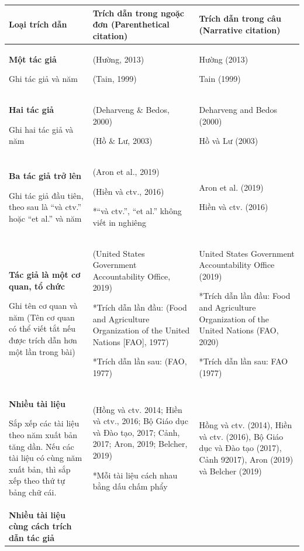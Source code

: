 \documentclass[a4paper,oneside]{../../styles/thesis}
\begin{document}
\begin{table}
\centering
\begin{tabular}{|l|l|l|}
    \hline
      Loại trích dẫn   & Trích dẫn trong ngoặc đơn (Parenthetical citation) & Trích dẫn trong câu 
(Narrative citation)
\\
     \hline
       \textbf{Một tác giả}
       
Ghi tác giả và năm
  & (Hường, 2013)
  
(Tain, 1999)
 & Hường (2013)
 
Tain (1999)
\\
    \hline
   \textbf{Hai tác giả}
   
Ghi hai tác giả và năm		
      & (Deharveng $\&$ Bedos, 2000) 
      
(Hồ $\&$ Lư, 2003) & Deharveng and Bedos (2000)

Hồ và Lư (2003)\\
         \hline
       \textbf{Ba tác giả trở lên}
       
Ghi tác giả đầu tiên, theo sau là ``và ctv.'' hoặc ``et al.'' và năm 
  & (Aron et al., 2019)
  
(Hiền và ctv., 2016)

*``và ctv.'', ``et al.'' không viết in nghiêng
 & Aron et al. (2019)
 
Hiền và ctv. (2016)
\\
\hline
  \textbf{Tác giả là một cơ quan, tổ chức}
  
Ghi tên cơ quan và năm (Tên cơ quan có thể viết tắt nếu được trích dẫn hơn một lần trong bài)
       &  (United States Government Accountability Office, 2019)

*Trích dẫn lần đầu:
 (Food and Agriculture Organization of the United Nations [FAO], 1977)
 
*Trích dẫn lần sau:
(FAO, 1977)
 & United States Government Accountability Office (2019)

*Trích dẫn lần đầu:
Food and Agriculture Organization of the United Nations (FAO, 2020)

*Trích dẫn lần sau:
FAO (1977)
 \\
      \hline
       \textbf{Nhiều tài liệu}
       
Sắp xếp các tài liệu theo năm xuất bản tăng dần. Nếu các tài liệu có cùng năm xuất bản, thì sắp xếp theo thứ tự bảng chữ cái.
  & (Hồng và ctv. 2014; Hiền và ctv., 2016; Bộ Giáo dục và Đào tạo, 2017; Cảnh, 2017; Aron, 2019; Belcher, 2019)
  
  *Mỗi tài liệu cách nhau bằng dấu chấm phẩy 
  & Hồng và ctv. (2014), Hiền và ctv. (2016), Bộ Giáo dục và Đào tạo (2017), Cảnh 92017), Aron (2019) và Belcher (2019) \\
         \hline
     \textbf{Nhiều tài liệu cùng cách trích dẫn tác giả}
     

\end{tabular}
\end{table}
\end{document}
